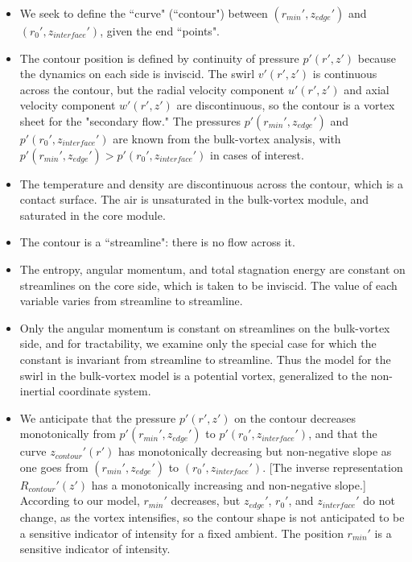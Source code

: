 \documentclass[preprint, prX]{revtex4}
\newcommand{\rmin}{r_{min}}
\newcommand{\zedge}{z_{edge}}
\newcommand{\zinter}{z_{interface}}
\begin{document}
\begin{itemize}

\item We seek to define the ``curve" (``contour") between $(\rmin', \zedge')$ and $(r_0', \zinter')$, given the end ``points".

\item The contour position is defined by continuity of pressure $p'(r',z')$ because the dynamics on each side is inviscid. The swirl $v'(r',z')$ is continuous across the contour, but the radial velocity component $u'(r',z')$ and axial velocity component $w'(r',z')$ are discontinuous, so the contour is a vortex sheet for the "secondary flow." The pressures $p'(\rmin',\zedge')$ and $p'(r_0',\zinter')$ are known from the bulk-vortex analysis, with $p'(\rmin',\zedge') > p'(r_0',\zinter')$ in cases of interest.

\item The temperature and density are discontinuous across the contour, which is a contact surface. The air is unsaturated in the bulk-vortex module, and saturated in the core module.

\item The contour is a ``streamline": there is no flow across it.

\item The entropy, angular momentum, and total stagnation energy are constant on streamlines on the core side, which is taken to be inviscid. The value of each variable varies from streamline to streamline.

\item Only the angular momentum is constant on streamlines on the bulk-vortex side, and for tractability, we examine only the special case for which the constant is invariant from streamline to streamline. Thus the model for the swirl in the bulk-vortex model is a potential vortex, generalized to the non-inertial coordinate system.

\item We anticipate that the pressure $p'(r',z')$ on the contour decreases monotonically from $p'(\rmin',\zedge')$ to $p'(r_0',\zinter')$, and that the curve $z_{contour}'(r')$ has monotonically decreasing but non-negative slope as one goes from $(\rmin', \zedge')$ to $(r_0', \zinter')$. [The inverse representation $R_{contour}'(z')$ has a monotonically increasing and non-negative slope.] According to our model, $\rmin'$ decreases, but $\zedge'$, $r_0'$, and $\zinter'$ do not change, as the vortex intensifies, so the contour shape is not anticipated to be a sensitive indicator of intensity for a fixed ambient. The position $\rmin'$ is a sensitive indicator of intensity.
\end{itemize}
\end{document}
